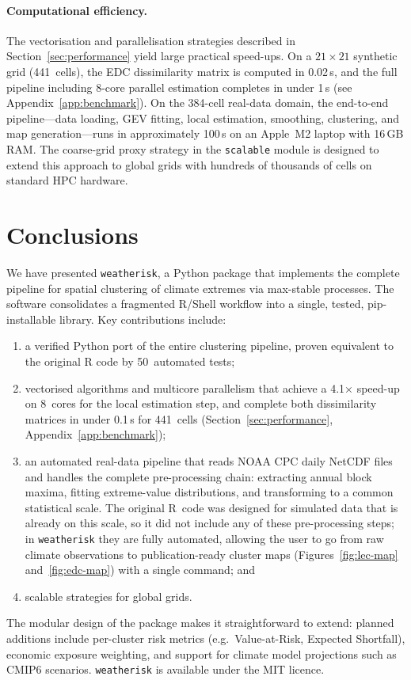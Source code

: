 \documentclass[preprint,12pt,a4paper]{elsarticle}
\begin{document}
\paragraph{Computational efficiency.}
The vectorisation and parallelisation strategies described in
Section~\ref{sec:performance} yield large practical speed-ups.
On a $21 \times 21$ synthetic grid (441~cells), the EDC
dissimilarity matrix is computed in 0.02\,s, and the full pipeline
including 8-core parallel estimation completes in under 1\,s
(see Appendix~\ref{app:benchmark}).  On the 384-cell real-data
domain, the end-to-end pipeline---data loading, GEV fitting,
local estimation, smoothing, clustering, and map generation---runs
in approximately 100\,s on an Apple~M2 laptop with 16\,GB RAM.
The coarse-grid proxy strategy in the \texttt{scalable} module is
designed to extend this approach to global grids with hundreds of
thousands of cells on standard HPC hardware.

\section{Conclusions}
\label{sec:conclusions}

We have presented \texttt{weatherisk}, a Python package that
implements the complete pipeline for spatial clustering of climate
extremes via max-stable processes.  The software consolidates a
fragmented R/Shell workflow into a single, tested, pip-installable
library.  Key contributions include:
\begin{enumerate}
\item a verified Python port of the entire clustering pipeline,
  proven equivalent to the original R code by 50~automated tests;
\item vectorised algorithms and multicore parallelism that
  achieve a 4.1$\times$ speed-up on 8~cores for the local
  estimation step, and complete both dissimilarity matrices in
  under 0.1\,s for 441~cells
  (Section~\ref{sec:performance}, Appendix~\ref{app:benchmark});
\item an automated real-data pipeline that reads NOAA CPC daily
  NetCDF files and handles the complete pre-processing chain:
  extracting annual block maxima, fitting extreme-value
  distributions, and transforming to a common statistical scale.
  The original R~code was designed for simulated data that is
  already on this scale, so it did not include any of these
  pre-processing steps; in \texttt{weatherisk} they are fully
  automated, allowing the user to go from raw climate observations
  to publication-ready cluster maps
  (Figures~\ref{fig:lec-map} and~\ref{fig:edc-map}) with a single
  command; and
\item scalable strategies for global grids.
\end{enumerate}
The modular design of the package makes it straightforward to
extend: planned additions include per-cluster risk metrics
(e.g.\ Value-at-Risk, Expected Shortfall), economic exposure
weighting, and support for climate model projections such as
CMIP6 scenarios.  \texttt{weatherisk} is available under the
MIT licence.
\end{document}

